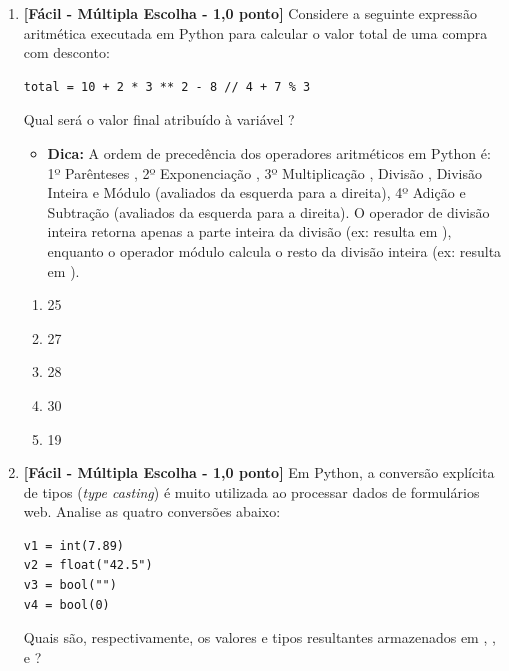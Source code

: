 \begin{enumerate}[label=\textbf{Q\arabic*.}, start=1]

\item \textbf{[Fácil - Múltipla Escolha - 1,0 ponto]} Considere a seguinte expressão aritmética executada em Python para calcular o valor total de uma compra com desconto:
\begin{verbatim}
total = 10 + 2 * 3 ** 2 - 8 // 4 + 7 % 3
\end{verbatim}
Qual será o valor final atribuído à variável ?

\begin{itemize}[leftmargin=*]
    \item \textbf{Dica:} A ordem de precedência dos operadores aritméticos em Python é: 1º Parênteses \code{()}, 2º Exponenciação \code{**}, 3º Multiplicação \code{*}, Divisão \code{/}, Divisão Inteira \code{//} e Módulo \code{\%} (avaliados da esquerda para a direita), 4º Adição \code{+} e Subtração \code{-} (avaliados da esquerda para a direita). O operador de divisão inteira \code{//} retorna apenas a parte inteira da divisão (ex:  resulta em ), enquanto o operador módulo \code{\%} calcula o resto da divisão inteira (ex:  resulta em ).
\end{itemize}

\begin{enumerate}[label=\textbf{(\Alph*)}]
    \item 25
    \item 27
    \item 28
    \item 30
    \item 19
\end{enumerate}



\vspace{0.4cm}

\item \textbf{[Fácil - Múltipla Escolha - 1,0 ponto]} Em Python, a conversão explícita de tipos (\emph{type casting}) é muito utilizada ao processar dados de formulários web. Analise as quatro conversões abaixo:
\begin{verbatim}
v1 = int(7.89)
v2 = float("42.5")
v3 = bool("")
v4 = bool(0)
\end{verbatim}
Quais são, respectivamente, os valores e tipos resultantes armazenados em , ,  e ?


\end{enumerate}
